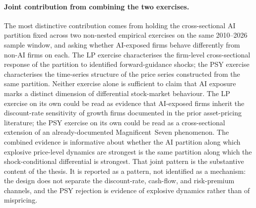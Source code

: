 \paragraph{Joint contribution from combining the two exercises.} The
most distinctive contribution comes from holding the cross-sectional
AI partition fixed across two non-nested empirical exercises on the
same 2010--2026 sample window, and asking whether AI-exposed firms
behave differently from non-AI firms on each. The LP exercise
characterises the firm-level cross-sectional response of the
partition to identified forward-guidance shocks; the PSY exercise
characterises the time-series structure of the price series
constructed from the same partition. Neither exercise alone is
sufficient to claim that AI exposure marks a distinct dimension of
differential stock-market behaviour. The LP exercise on its own
could be read as evidence that AI-exposed firms inherit the
discount-rate sensitivity of growth firms documented in the prior
asset-pricing literature; the PSY exercise on its own could be read
as a cross-sectional extension of an already-documented
Magnificent~Seven phenomenon. The combined evidence is informative
about whether the AI partition along which explosive price-level
dynamics are strongest is the same partition along which the
shock-conditional differential is strongest. That joint pattern is
the substantive content of the thesis. It is reported as a pattern,
not identified as a mechanism: the design does not separate the
\citet{campbellAmmer1993} discount-rate, cash-flow, and risk-premium
channels, and the PSY rejection is evidence of explosive dynamics
rather than of mispricing.